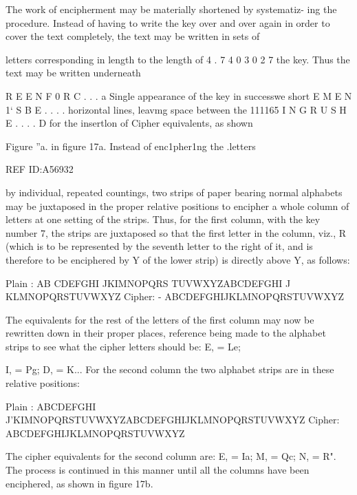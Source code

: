 {{{The work of encipherment may be materially shortened by systematiz-
ing the procedure. Instead of having to write the key over and over again
in order to cover the text completely, the text may be written in sets of

letters corresponding in length to the length of
4 .
7 4 0 3 0 2 7 the key. Thus the text may be written underneath

R E E N F 0 R C . . .
a Single appearance of the key in successwe short
E M E N 1‘ S B E . . . .
horizontal lines, leavmg space between the 111165
I N G R U S H E . . . .
D for the insertlon of Cipher equivalents, as shown

Figure ”a. in ﬁgure 17a. Instead of enc1pher1ng the .letters

 

 

 

REF ID:A56932

by individual, repeated countings, two strips of paper bearing normal
alphabets may be juxtaposed in the proper relative positions to encipher
a whole column of letters at one setting of the strips. Thus, for the ﬁrst
column, with the key number 7, the strips are juxtaposed so that the ﬁrst
letter in the column, viz., R (which is to be represented by the seventh
letter to the right of it, and is therefore to be enciphered by Y of the
lower strip) is directly above Y, as follows:

Plain :
AB CDEFGHI JKIMNOPQRS TUVWXYZABCDEFGHI J KLMNOPQRSTUVWXYZ
Cipher: - ABCDEFGHIJKLMNOPQRSTUVWXYZ

The equivalents for the rest of the letters of the ﬁrst column may now
be rewritten down in their proper places, reference being made to the
alphabet strips to see what the cipher letters should be: E, = Le;

I, = Pg; D, = K... For the second column the two alphabet strips are
in these relative positions:

Plain :
ABCDEFGHI J'KIMNOPQRSTUVWXYZABCDEFGHIJKLMNOPQRSTUVWXYZ
Cipher: ABCDEFGHIJKLMNOPQRSTUVWXYZ

The cipher equivalents for the second column are: E, = Ia; M, = Qc;
N, = R". The process is continued in this manner until all the columns
have been enciphered, as shown in ﬁgure 17b.

 

 

 

 

 

}}}
